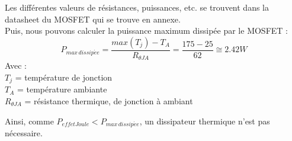 Les différentes valeurs de résistances, puissances, etc. se trouvent dans la datasheet du MOSFET qui se trouve en annexe. \\

Puis, nous pouvons calculer la puissance maximum dissipée par le MOSFET :
\[P_{max\,dissip\acute{e}e} = \frac{max(T_j) - T_A}{R_{\theta JA}} = \frac{175-25}{62}\cong 2.42 W\]
Avec :\\
$T_j$ = température de jonction\\
$T_A$ = température ambiante\\
$R_{\theta JA}$ = résistance thermique, de jonction à ambiant

Ainsi, comme $P_{effetJoule} < P_{max\,dissip\acute{e}e}$, un dissipateur thermique n'est pas nécessaire. \\


